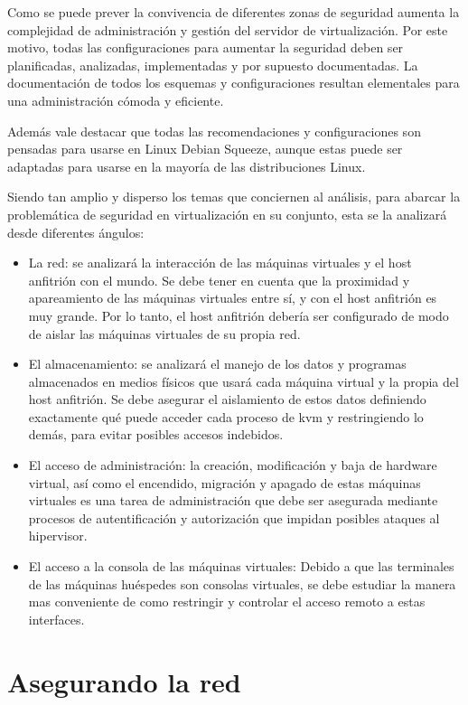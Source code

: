 	Como se puede prever la convivencia de diferentes zonas de seguridad aumenta la complejidad de administración y gestión del servidor de virtualización. Por este motivo, todas las configuraciones para aumentar la seguridad deben ser planificadas, analizadas, implementadas y por supuesto documentadas. La documentación de todos los esquemas y configuraciones resultan elementales para una administración cómoda y eficiente. \newline
	
	Además vale destacar que todas las recomendaciones y configuraciones son pensadas para usarse en Linux Debian Squeeze, aunque estas puede ser adaptadas para usarse en la mayoría de las
	distribuciones Linux. \newline
	
	Siendo tan amplio y disperso los temas que conciernen al análisis, para abarcar la problemática de seguridad en virtualización en su conjunto, esta se la analizará desde diferentes ángulos:
	\begin{itemize}
		\item La red: se analizará la interacción de las máquinas virtuales y el host anfitrión con el mundo. Se debe tener en cuenta que la proximidad y apareamiento de las máquinas virtuales entre sí, y con el host anfitrión es muy grande. Por lo tanto, el host anfitrión debería ser configurado de modo de aislar las máquinas virtuales de su propia red.
		\item El almacenamiento: se analizará el manejo de los datos y programas almacenados en medios físicos que usará cada máquina virtual y la propia del host anfitrión. Se debe asegurar el aislamiento de estos datos definiendo exactamente qué puede acceder cada proceso de kvm y restringiendo lo demás, para evitar posibles accesos indebidos.
		\item El acceso de administración: la creación, modificación y baja de hardware virtual, así como el encendido, migración y apagado de estas máquinas virtuales es una tarea de administración que debe ser asegurada mediante procesos de autentificación y autorización que impidan posibles ataques al hipervisor.
		\item El acceso a la consola de las máquinas virtuales: Debido a que las terminales de las máquinas huéspedes son consolas virtuales, se debe estudiar la manera mas conveniente de como restringir y controlar el acceso remoto a estas interfaces.
	\end{itemize}

	\section{Asegurando la red}
	
